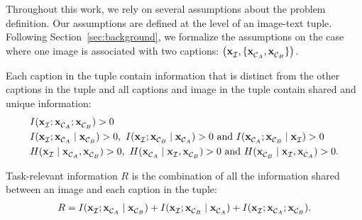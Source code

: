 Throughout this work, we rely on several assumptions about the problem definition. 
Our assumptions are defined at the level of an image-text tuple. Following Section~\ref{sec:background}, we formalize the assumptions on the case where one image is associated with two captions: $\left(\img{}, \{ \capt{}{A}, \capt{}{B} \} \right)$.

\begin{assumption}
\label{asm:shared-unique}
	Each caption in the tuple contain information that is distinct from the other captions in the tuple and all captions and image in the tuple contain shared and unique information:
	\begin{align*}
		&I(\img{}; \capt{}{A}; \capt{}{B}) > 0 \\
		&I(\img{}; \capt{}{A} \mid \capt{}{B}) > 0,\  I(\img{}; \capt{}{B} \mid \capt{}{A}) > 0\ \text{and}\  I(\capt{}{A}; \capt{}{B} \mid \img{}) > 0 \\
		&H(\img{} \mid \capt{}{A}, \capt{}{B}) > 0,\ H(\capt{}{A} \mid \img{}, \capt{}{B}) > 0\ \text{and}\ H(\capt{}{B} \mid \img{}, \capt{}{A}) > 0.
	\end{align*}
\end{assumption}

\begin{assumption}
\label{asm:task-relevant-info}
	Task-relevant information $R$ is the combination of all the information shared between an image and each caption in the tuple:
	\begin{align*}
		R = I(\img{}; \capt{}{A} \mid \capt{}{B})  + I(\img{}; \capt{}{B} \mid \capt{}{A}) + I(\img{}; \capt{}{A}; \capt{}{B}).
	\end{align*}
\end{assumption}
